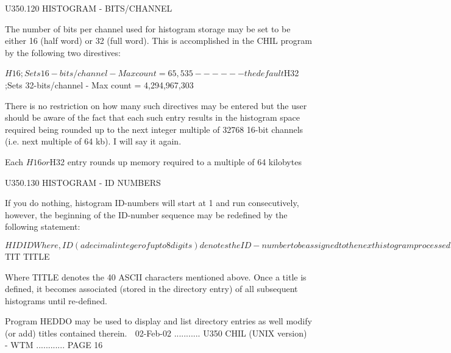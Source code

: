  
 
   U350.120  HISTOGRAM - BITS/CHANNEL
 
   The  number of bits per channel used for histogram storage may be set to be
   either 16 (half word) or 32 (full word). This is accomplished in  the  CHIL
   program by the following two direstives:
 
   $H16   ;Sets 16-bits/channel - Max count = 65,535 ------ the default
 
   $H32   ;Sets 32-bits/channel - Max count = 4,294,967,303
 
   There  is no restriction on how many such directives may be entered but the
   user should be aware of the fact  that  each  such  entry  results  in  the
   histogram  space  required being rounded up to the next integer multiple of
   32768 16-bit channels (i.e. next multiple of 64 kb). I will say it again.
 
       Each $H16 or $H32 entry rounds up memory required to a multiple of
                                  64 kilobytes
 
   U350.130  HISTOGRAM - ID NUMBERS
 
   If   you  do  nothing,  histogram  ID-numbers  will  start  at  1  and  run
   consecutively, however, the beginning of  the  ID-number  sequence  may  be
   redefined by the following statement:
 
   $HID  ID
 
   Where,  ID  (a  decimal integer of up to 8 digits) denotes the ID-number to
   be assigned to the next histogram processed. Histogram ID-sequences may  be
   defined  any  number  of  times in the CHIL program so long as one sequence
   does not overlap another.
 
   U350.140  HISTOGRAM - TITLES
 
   A title of up to 40 characters may be associated  with  each  histogram  by
   using the following statement.
 
   $TIT  TITLE
 
   Where  TITLE  denotes the 40 ASCII characters mentioned above. Once a title
   is defined, it becomes associated (stored in the directory  entry)  of  all
   subsequent histograms until re-defined.
 
   Program  HEDDO  may  be  used to display and list directory entries as well
   modify (or add) titles contained therein.
    
   02-Feb-02 ........... U350  CHIL (UNIX version) - WTM ............ PAGE  16
 
 
 
